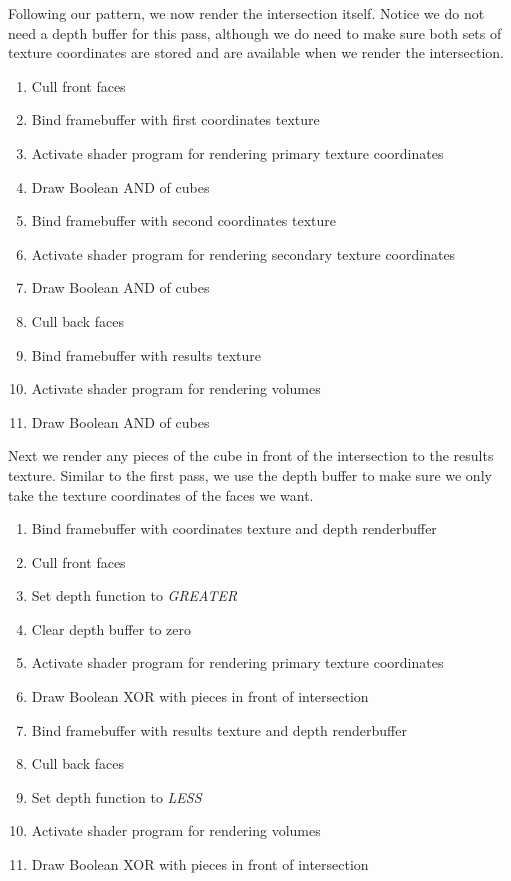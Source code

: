 \documentclass{report}
\begin{document}
Following our pattern, we now render the intersection itself.  Notice we do not
need a depth buffer for this pass, although we do need to make sure both sets of
texture coordinates are stored and are available when we render the
intersection.

\begin{enumerate}
  \item Cull front faces
  \item Bind framebuffer with first coordinates texture
  \item Activate shader program for rendering primary texture coordinates
  \item Draw Boolean AND of cubes
  \item Bind framebuffer with second coordinates texture
  \item Activate shader program for rendering secondary texture coordinates
  \item Draw Boolean AND of cubes
  \item Cull back faces
  \item Bind framebuffer with results texture
  \item Activate shader program for rendering volumes
  \item Draw Boolean AND of cubes
\end{enumerate}

Next we render any pieces of the cube in front of the intersection to the
results texture.  Similar to the first pass, we use the depth buffer to make
sure we only take the texture coordinates of the faces we want.

\begin{enumerate}
  \item Bind framebuffer with coordinates texture and depth renderbuffer
  \item Cull front faces
  \item Set depth function to \emph{GREATER}
  \item Clear depth buffer to zero
  \item Activate shader program for rendering primary texture coordinates
  \item Draw Boolean XOR with pieces in front of intersection
  \item Bind framebuffer with results texture and depth renderbuffer
  \item Cull back faces
  \item Set depth function to \emph{LESS}
  \item Activate shader program for rendering volumes
  \item Draw Boolean XOR with pieces in front of intersection
\end{enumerate}
\end{document}
